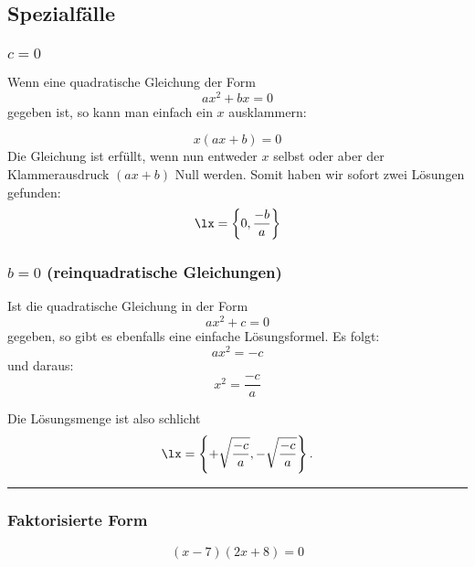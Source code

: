 \subsection{Spezialfälle}


\subsubsection{$c=0$}
Wenn eine quadratische Gleichung der Form
$$ax^2 +bx = 0$$
gegeben ist, so kann man einfach ein $x$ ausklammern:

$$x(ax+b)=0$$
 Die Gleichung ist erfüllt, wenn nun entweder $x$ selbst oder aber
 der Klammerausdruck $(ax+b)$ Null werden. Somit haben wir sofort zwei
 Lösungen gefunden:
 $$\lx=\left\{0, \frac{-b}{a}\right\}$$

 \newpage

 
 \subsubsection{$b=0$ (reinquadratische Gleichungen)}
 Ist die quadratische Gleichung in der Form
 $$ax^2 + c = 0$$
 gegeben, so gibt es ebenfalls eine einfache Lösungsformel. Es folgt:
 $$ax^2 = -c$$
 und daraus:
 $$x^2 = \frac{-c}{a}$$

 Die Lösungsmenge ist also schlicht
 $$\lx=\left\{ + \sqrt{\frac{-c}{a}}, -\sqrt{\frac{-c}{a}} \right\}.$$

 \hrule

 \subsubsection{Faktorisierte Form}

$$(x-7)(2x+8) = 0$$

\newpage
